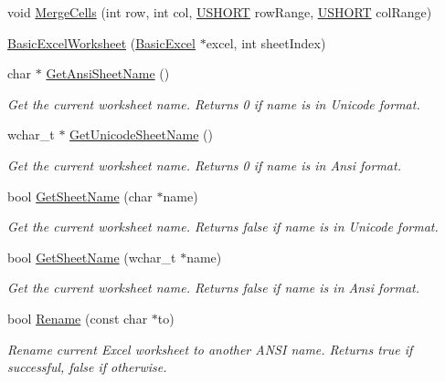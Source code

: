\begin{DoxyCompactItemize}
\item 
void \hyperlink{class_y_excel_1_1_basic_excel_worksheet_a88827fd80b0b55be52824d3e191b51cc}{Merge\+Cells} (int row, int col, \hyperlink{_basic_excel_8hpp_a5850d5316caf7f4cedd742fdf8cd7c02}{U\+S\+H\+O\+R\+T} row\+Range, \hyperlink{_basic_excel_8hpp_a5850d5316caf7f4cedd742fdf8cd7c02}{U\+S\+H\+O\+R\+T} col\+Range)
\item 
\hyperlink{class_y_excel_1_1_basic_excel_worksheet_a5b2b6fc3712e8e8742336ea058dc5a9c}{Basic\+Excel\+Worksheet} (\hyperlink{class_y_excel_1_1_basic_excel}{Basic\+Excel} $\ast$excel, int sheet\+Index)
\item 
char $\ast$ \hyperlink{class_y_excel_1_1_basic_excel_worksheet_a83a14ff0996bd3fd0e899b2b9df514c6}{Get\+Ansi\+Sheet\+Name} ()
\begin{DoxyCompactList}\small\item\em Get the current worksheet name. Returns 0 if name is in Unicode format. \end{DoxyCompactList}\item 
wchar\+\_\+t $\ast$ \hyperlink{class_y_excel_1_1_basic_excel_worksheet_af11230fe3e5f0e49b633c7b452d1c312}{Get\+Unicode\+Sheet\+Name} ()
\begin{DoxyCompactList}\small\item\em Get the current worksheet name. Returns 0 if name is in Ansi format. \end{DoxyCompactList}\item 
bool \hyperlink{class_y_excel_1_1_basic_excel_worksheet_a8f15128ba07fe3864ed0e0478a823baa}{Get\+Sheet\+Name} (char $\ast$name)
\begin{DoxyCompactList}\small\item\em Get the current worksheet name. Returns false if name is in Unicode format. \end{DoxyCompactList}\item 
bool \hyperlink{class_y_excel_1_1_basic_excel_worksheet_adb4f97665b32ce8501dbfebcded117a4}{Get\+Sheet\+Name} (wchar\+\_\+t $\ast$name)
\begin{DoxyCompactList}\small\item\em Get the current worksheet name. Returns false if name is in Ansi format. \end{DoxyCompactList}\item 
bool \hyperlink{class_y_excel_1_1_basic_excel_worksheet_a3258a153e308a91b9b48574bdf6aaa39}{Rename} (const char $\ast$to)
\begin{DoxyCompactList}\small\item\em Rename current Excel worksheet to another A\+N\+S\+I name. Returns true if successful, false if otherwise. \end{DoxyCompactList}\item 

\end{DoxyCompactItemize}

